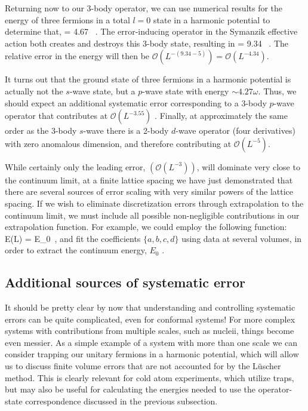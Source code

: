 Returning now to our 3-body operator, we can use numerical results for the energy of three fermions in a total $l=0$ state in a harmonic potential \cite{2007PhRvL..99w3201B,2011CRPhy..12...86B} to determine that,
\beq
\left[\psi\psi\psi\right] = 4.67 \ .
\eeq
The error-inducing operator in the Symanzik effective action both creates and destroys this 3-body state, resulting in
\beq
\left[\left(\psi\psi\psi\right)^{\dagger}\psi\psi\psi\right] = 9.34 \ .
\eeq
The relative error in the energy will then be ${\mathcal{ O}}\left(L^{-(9.34-5)}\right) = {\mathcal{ O}}\left(L^{-4.34}\right)$.

It turns out that the ground state of three fermions in a harmonic potential is actually not the $s$-wave state, but a $p$-wave state with energy $\sim 4.27\omega$. Thus, we should expect an additional systematic error corresponding to a 3-body $p$-wave operator that contributes at ${\mathcal{ O}}\left(L^{-3.55}\right)$ \cite{2006PhRvL..97o0401W}. Finally, at approximately the same order as the 3-body $s$-wave there is a 2-body $d$-wave operator (four derivatives) with zero anomalous dimension, and therefore contributing at ${\mathcal{ O}}\left(L^{-5}\right)$.

While certainly only the leading error, $\left({\mathcal{ O}}\left(L^{-3}\right)\right)$, will dominate very close to the continuum limit, at a finite lattice spacing we have just demonstrated that there are several sources of error scaling with very similar powers of the lattice spacing. If we wish to eliminate discretization errors through extrapolation to the continuum limit, we must include all possible non-negligible contributions in our extrapolation function. For example, we could employ the following function:
\beq
E(L) = E_0 \ ,
\eeq
and fit the coefficients $\{a,b,c,d\}$ using data at several volumes, in order to extract the continuum energy, $E_0$ \cite{EKLN4}.

\subsection{Additional sources of systematic error}
It should be pretty clear by now that understanding and controlling systematic errors can be quite complicated, even for conformal systems! For more complex systems with contributions from multiple scales, such as nucleii, things become even messier. As a simple example of a system with more than one scale we can consider trapping our unitary fermions in a harmonic potential, which will allow us to discuss finite volume errors that are not accounted for by the L\"uscher method. This is clearly relevant for cold atom experiments, which utilize traps, but may also be useful for calculating the energies needed to use the operator-state correspondence discussed in the previous subsection.

